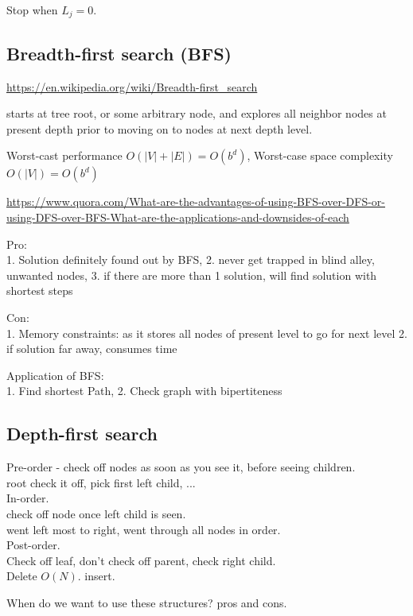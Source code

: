 \documentclass[10pt]{amsart}
\begin{document}
Stop when $L_j=0$.

\subsection{Breadth-first search (BFS)}

\url{https://en.wikipedia.org/wiki/Breadth-first_search}

starts at tree root, or some arbitrary node, and explores all neighbor nodes at present depth prior to moving on to nodes at next depth level.

Worst-cast performance $O(|V|+|E|) = O(b^d)$, Worst-case space complexity $O(|V|) = O(b^d)$

\url{https://www.quora.com/What-are-the-advantages-of-using-BFS-over-DFS-or-using-DFS-over-BFS-What-are-the-applications-and-downsides-of-each}

Pro: \\
1. Solution definitely found out by BFS, 2. never get trapped in blind alley, unwanted nodes, 3. if there are more than 1 solution, will find solution with shortest steps

Con: \\
1. Memory constraints: as it stores all nodes of present level to go for next level
2. if solution far away, consumes time

Application of BFS: \\
1. Find shortest Path,
2. Check graph with bipertiteness

\subsection{Depth-first search}

Pre-order - check off nodes as soon as you see it, before seeing children. \\
root check it off, pick first left child, ... \\

In-order. \\
check off node once left child is seen. \\
went left most to right, went through all nodes in order. \\

Post-order. \\
Check off leaf, don't check off parent, check right child. \\

Delete $O(N)$.
insert.

When do we want to use these structures? pros and cons.
\end{document}
